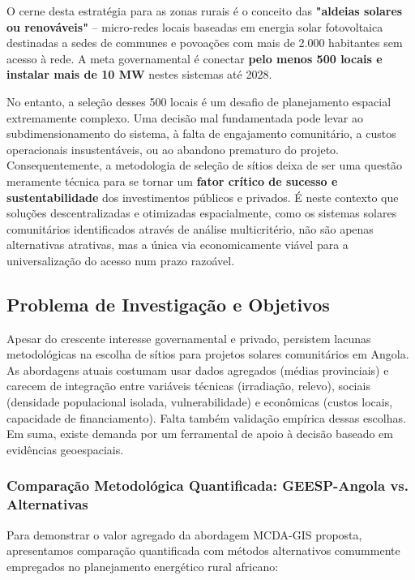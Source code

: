 \documentclass[12pt, a4paper]{article}
\begin{document}
{{{{{{{{{{{{O cerne desta estratégia para as zonas rurais é o conceito das \textbf{"aldeias solares ou renováveis"} – micro-redes locais baseadas em energia solar fotovoltaica destinadas a sedes de communes e povoações com mais de 2.000 habitantes sem acesso à rede. A meta governamental é conectar \textbf{pelo menos 500 locais e instalar mais de 10 MW} nestes sistemas até 2028. 

No entanto, a seleção desses 500 locais é um desafio de planejamento espacial extremamente complexo. Uma decisão mal fundamentada pode levar ao subdimensionamento do sistema, à falta de engajamento comunitário, a custos operacionais insustentáveis, ou ao abandono prematuro do projeto. Consequentemente, a metodologia de seleção de sítios deixa de ser uma questão meramente técnica para se tornar um \textbf{fator crítico de sucesso e sustentabilidade} dos investimentos públicos e privados. É neste contexto que soluções descentralizadas e otimizadas espacialmente, como os sistemas solares comunitários identificados através de análise multicritério, não são apenas alternativas atrativas, mas a única via economicamente viável para a universalização do acesso num prazo razoável.

\subsection{Problema de Investigação e Objetivos}

Apesar do crescente interesse governamental e privado, persistem lacunas metodológicas na escolha de sítios para projetos solares comunitários em Angola. As abordagens atuais costumam usar dados agregados (médias provinciais) e carecem de integração entre variáveis técnicas (irradiação, relevo), sociais (densidade populacional isolada, vulnerabilidade) e econômicas (custos locais, capacidade de financiamento). Falta também validação empírica dessas escolhas. Em suma, existe demanda por um ferramental de apoio à decisão baseado em evidências geoespaciais.

\subsubsection{Comparação Metodológica Quantificada: GEESP-Angola vs. Alternativas}

Para demonstrar o valor agregado da abordagem MCDA-GIS proposta, apresentamos comparação quantificada com métodos alternativos comummente empregados no planejamento energético rural africano:

}}}}}}}}}}}}
\end{document}
